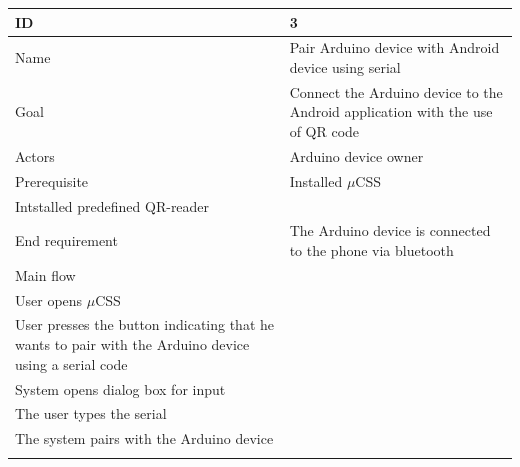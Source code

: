 \begin{table}
    \begin{tabular}{|l|l|}
        \hline
        ID               & 3                                                                                                                                                                                                                                             \\ \hline
        Name             & Pair Arduino device with Android device using serial                                                                                                                                                                                          \\ 
        Goal             & Connect the Arduino device to the Android application with the use of QR code                                                                                                                                                                 \\ 
        Actors           & Arduino device owner     								             \\ 
        Prerequisite     &     Installed $\mu$CSS \\     Intstalled predefined QR-reader                                                                                                                                                                                 \\ 
        End requirement  & The Arduino device is connected to the phone via bluetooth                                                                                                                                                                                    \\ 
        Main flow        & \begin{itemize} \\ \item{User opens $\mu$CSS} \\ \item{User presses the button indicating that he wants to pair with the Arduino device using a serial code} \\ \item{System opens dialog box for input} \\ \item{The user types the serial} \\ \item{The system pairs with the Arduino device} \\ \end{itemize} \\
 

\end{tabular}
\end{table}
